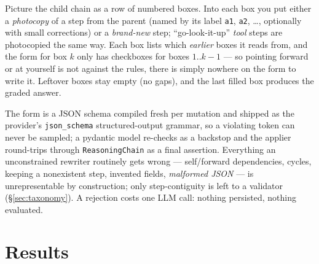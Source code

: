 \documentclass[11pt]{article}
\newenvironment{eli5}
  {\par\medskip\noindent\begin{lrbox}{\eliBox}\begin{minipage}{\dimexpr\linewidth-2\fboxsep-2\fboxrule}\small}
  {\end{minipage}\end{lrbox}\noindent\fcolorbox{accent!40}{accent!4}{\usebox{\eliBox}}\par\medskip}
\begin{document}
\begin{eli5}
Picture the child chain as a row of numbered boxes. Into each box you put either a
\emph{photocopy} of a step from the parent (named by its label \texttt{a1}, \texttt{a2}, \dots,
optionally with small corrections) or a \emph{brand-new} step; ``go-look-it-up'' \emph{tool}
steps are photocopied the same way. Each box lists which \emph{earlier} boxes it reads from,
and the form for box $k$ only has checkboxes for boxes $1..k{-}1$ --- so pointing forward or at
yourself is not against the rules, there is simply nowhere on the form to write it. Leftover
boxes stay empty (no gaps), and the last filled box produces the graded answer.
\end{eli5}
\noindent
The form is a JSON schema compiled fresh per mutation and shipped as the provider's
\texttt{json\_schema} structured-output grammar, so a violating token can never be sampled; a
pydantic model re-checks as a backstop and the applier round-trips through \texttt{ReasoningChain}
as a final assertion. Everything an unconstrained rewriter routinely gets wrong ---
self/forward dependencies, cycles, keeping a nonexistent step, invented fields, \emph{malformed
JSON} --- is unrepresentable by construction; only step-contiguity is left to a validator
(\S\ref{sec:taxonomy}). A rejection costs one LLM call: nothing persisted, nothing evaluated.

\section{Results}
\label{sec:results}
\end{document}
